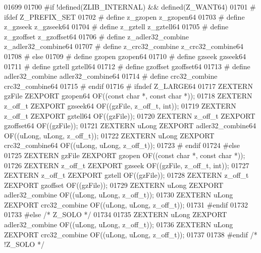 \begin{DoxyCode}
01699 
01700 \textcolor{preprocessor}{#if !defined(ZLIB\_INTERNAL) && defined(Z\_WANT64)}
01701 \textcolor{preprocessor}{#  ifdef Z\_PREFIX\_SET}
01702 \textcolor{preprocessor}{#    define z\_gzopen z\_gzopen64}
01703 \textcolor{preprocessor}{#    define z\_gzseek z\_gzseek64}
01704 \textcolor{preprocessor}{#    define z\_gztell z\_gztell64}
01705 \textcolor{preprocessor}{#    define z\_gzoffset z\_gzoffset64}
01706 \textcolor{preprocessor}{#    define z\_adler32\_combine z\_adler32\_combine64}
01707 \textcolor{preprocessor}{#    define z\_crc32\_combine z\_crc32\_combine64}
01708 \textcolor{preprocessor}{#  else}
01709 \textcolor{preprocessor}{#    define gzopen gzopen64}
01710 \textcolor{preprocessor}{#    define gzseek gzseek64}
01711 \textcolor{preprocessor}{#    define gztell gztell64}
01712 \textcolor{preprocessor}{#    define gzoffset gzoffset64}
01713 \textcolor{preprocessor}{#    define adler32\_combine adler32\_combine64}
01714 \textcolor{preprocessor}{#    define crc32\_combine crc32\_combine64}
01715 \textcolor{preprocessor}{#  endif}
01716 \textcolor{preprocessor}{#  ifndef Z\_LARGE64}
01717      ZEXTERN gzFile ZEXPORT gzopen64 OF((\textcolor{keyword}{const} \textcolor{keywordtype}{char} *, \textcolor{keyword}{const} \textcolor{keywordtype}{char} *));
01718      ZEXTERN z\_off\_t ZEXPORT gzseek64 OF((gzFile, z\_off\_t, \textcolor{keywordtype}{int}));
01719      ZEXTERN z\_off\_t ZEXPORT gztell64 OF((gzFile));
01720      ZEXTERN z\_off\_t ZEXPORT gzoffset64 OF((gzFile));
01721      ZEXTERN uLong ZEXPORT adler32\_combine64 OF((uLong, uLong, z\_off\_t));
01722      ZEXTERN uLong ZEXPORT crc32\_combine64 OF((uLong, uLong, z\_off\_t));
01723 \textcolor{preprocessor}{#  endif}
01724 \textcolor{preprocessor}{#else}
01725    ZEXTERN gzFile ZEXPORT gzopen OF((\textcolor{keyword}{const} \textcolor{keywordtype}{char} *, \textcolor{keyword}{const} \textcolor{keywordtype}{char} *));
01726    ZEXTERN z\_off\_t ZEXPORT gzseek OF((gzFile, z\_off\_t, \textcolor{keywordtype}{int}));
01727    ZEXTERN z\_off\_t ZEXPORT gztell OF((gzFile));
01728    ZEXTERN z\_off\_t ZEXPORT gzoffset OF((gzFile));
01729    ZEXTERN uLong ZEXPORT adler32\_combine OF((uLong, uLong, z\_off\_t));
01730    ZEXTERN uLong ZEXPORT crc32\_combine OF((uLong, uLong, z\_off\_t));
01731 \textcolor{preprocessor}{#endif}
01732 
01733 \textcolor{preprocessor}{#else }\textcolor{comment}{/* Z\_SOLO */}\textcolor{preprocessor}{}
01734 
01735    ZEXTERN uLong ZEXPORT adler32\_combine OF((uLong, uLong, z\_off\_t));
01736    ZEXTERN uLong ZEXPORT crc32\_combine OF((uLong, uLong, z\_off\_t));
01737 
01738 \textcolor{preprocessor}{#endif }\textcolor{comment}{/* !Z\_SOLO */}\textcolor{preprocessor}{}

\end{DoxyCode}
